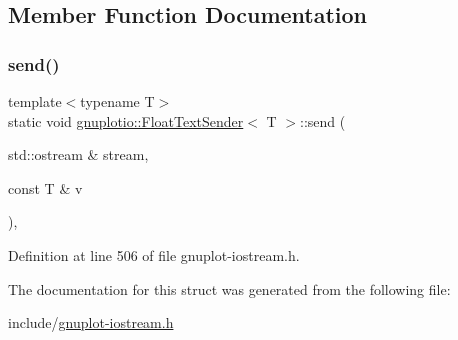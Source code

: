 \subsection{Member Function Documentation}
\mbox{\label{structgnuplotio_1_1_float_text_sender_aed6b6c3a95b1396688800d6d1f2fc299}} 
\subsubsection{\texorpdfstring{send()}{send()}}
{\footnotesize\ttfamily template$<$typename T$>$ \\
static void \hyperlink{structgnuplotio_1_1_float_text_sender}{gnuplotio\+::\+Float\+Text\+Sender}$<$ T $>$\+::send (\begin{DoxyParamCaption}\item[{std\+::ostream \&}]{stream,  }\item[{const T \&}]{v }\end{DoxyParamCaption})\hspace{0.3cm}{\ttfamily [inline]}, {\ttfamily [static]}}



Definition at line 506 of file gnuplot-\/iostream.\+h.



The documentation for this struct was generated from the following file\+:\begin{DoxyCompactItemize}
\item 
include/\hyperlink{gnuplot-iostream_8h}{gnuplot-\/iostream.\+h}\end{DoxyCompactItemize}
